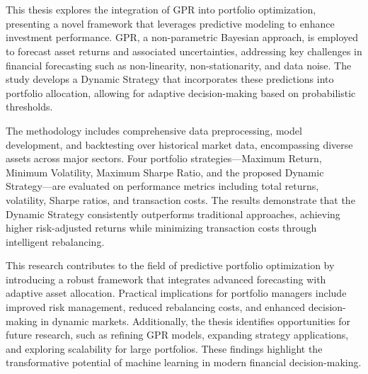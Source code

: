 \chapter{\abstractname}

This thesis explores the integration of \ac{GPR} into portfolio optimization, presenting a novel framework that leverages predictive modeling to enhance investment performance. \ac{GPR}, a non-parametric Bayesian approach, is employed to forecast asset returns and associated uncertainties, addressing key challenges in financial forecasting such as non-linearity, non-stationarity, and data noise. The study develops a Dynamic Strategy that incorporates these predictions into portfolio allocation, allowing for adaptive decision-making based on probabilistic thresholds.

The methodology includes comprehensive data preprocessing, model development, and backtesting over historical market data, encompassing diverse assets across major sectors. Four portfolio strategies—Maximum Return, Minimum Volatility, Maximum Sharpe Ratio, and the proposed Dynamic Strategy—are evaluated on performance metrics including total returns, volatility, Sharpe ratios, and transaction costs. The results demonstrate that the Dynamic Strategy consistently outperforms traditional approaches, achieving higher risk-adjusted returns while minimizing transaction costs through intelligent rebalancing.

This research contributes to the field of predictive portfolio optimization by introducing a robust framework that integrates advanced forecasting with adaptive asset allocation. Practical implications for portfolio managers include improved risk management, reduced rebalancing costs, and enhanced decision-making in dynamic markets. Additionally, the thesis identifies opportunities for future research, such as refining GPR models, expanding strategy applications, and exploring scalability for large portfolios. These findings highlight the transformative potential of machine learning in modern financial decision-making.